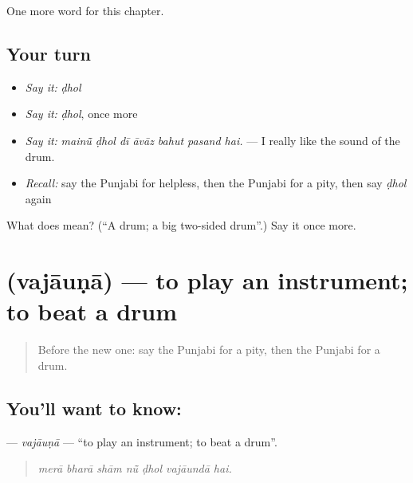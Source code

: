\begin{grammarlens}[title={What you've built}]
One more word for this chapter.
\end{grammarlens}

\subsection*{Your turn}
\begin{itemize}
\raggedright
  \item \emph{Say it:} \emph{ḍhol}
  \item \emph{Say it:} \emph{ḍhol}, once more
  \item \emph{Say it:} \emph{mainū̃ ḍhol dī āvāz bahut pasand hai.} — I really like the sound of the drum.
  \item \emph{Recall:} say the Punjabi for helpless, then the Punjabi for a pity, then say \emph{ḍhol} again
\end{itemize}

\begin{tcolorbox}[breakable,colback=teal!4,colframe=teal!35!black,title={Before you move on}]
What does  mean? (\textquotedblleft{}A drum; a big two-sided drum\textquotedblright{}.) Say it once more.
\end{tcolorbox}
\section[\texorpdfstring{\pa{ਵਜਾਉਣਾ} (vajāuṇā)}{ਵਜਾਉਣਾ (vajāuṇā)}]{ (vajāuṇā) — to play an instrument; to beat a drum}

\label{lesson:PA-C347-vajauna}



\begin{quote}
Before the new one: say the Punjabi for a pity, then the Punjabi for a drum.
\end{quote}

\subsection*{You'll want to know: }
\textbf{} — \emph{vajāuṇā} — \textquotedblleft{}to play an instrument; to beat a drum\textquotedblright{}.

\begin{quote}
      
\end{quote}

\begin{quote}
\emph{merā bharā shām nū̃ ḍhol vajāundā hai.}
\end{quote}

